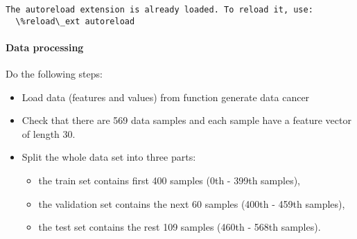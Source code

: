 \documentclass[11pt]{article}
\providecommand{\tightlist}{%
      \setlength{\itemsep}{0pt}\setlength{\parskip}{0pt}}
\begin{document}
    \begin{Verbatim}[commandchars=\\\{\}]
The autoreload extension is already loaded. To reload it, use:
  \%reload\_ext autoreload

    \end{Verbatim}

    \paragraph{Data processing}\label{data-processing}

Do the following steps:

\begin{itemize}
\tightlist
\item
  Load data (features and values) from function generate data cancer
\item
  Check that there are 569 data samples and each sample have a feature
  vector of length 30.
\item
  Split the whole data set into three parts:

  \begin{itemize}
  \tightlist
  \item
    the train set contains first 400 samples (0th - 399th samples),
  \item
    the validation set contains the next 60 samples (400th - 459th
    samples),
  \item
    the test set contains the rest 109 samples (460th - 568th samples).
  \end{itemize}
\end{itemize}
\end{document}
